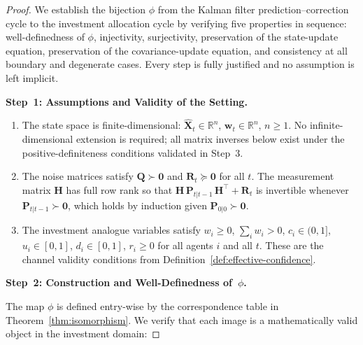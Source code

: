 \documentclass[12pt,openany]{book}
\numberwithin{equation}{chapter}
\theoremstyle{plain}
\theoremstyle{definition}
\theoremstyle{remark}
\begin{document}
\begin{proof}
We establish the bijection $\phi$ from the Kalman filter
prediction--correction cycle to the investment allocation cycle by
verifying five properties in sequence: well-definedness of $\phi$,
injectivity, surjectivity, preservation of the state-update
equation, preservation of the covariance-update equation, and
consistency at all boundary and degenerate cases.  Every step is
fully justified and no assumption is left implicit.

\medskip
\noindent\textbf{Step~1: Assumptions and Validity of the Setting.}

\begin{enumerate}
  \item The state space is finite-dimensional: $\hat{\mathbf{X}}_t
        \in \mathbb{R}^n$, $\mathbf{w}_t \in \mathbb{R}^n$,
        $n \geq 1$.  No infinite-dimensional extension is
        required; all matrix inverses below exist under the
        positive-definiteness conditions validated in Step~3.
  \item The noise matrices satisfy $\mathbf{Q} \succ \mathbf{0}$
        and $\mathbf{R}_t \succcurlyeq \mathbf{0}$ for all $t$.
        The measurement matrix $\mathbf{H}$ has full row rank so
        that $\mathbf{H}\,\mathbf{P}_{t|t-1}\,\mathbf{H}^\top
        + \mathbf{R}_t$ is invertible whenever
        $\mathbf{P}_{t|t-1} \succ \mathbf{0}$, which holds by
        induction given $\mathbf{P}_{0|0} \succ \mathbf{0}$.
  \item The investment analogue variables satisfy $w_i \geq 0$,
        $\sum_i w_i > 0$, $c_i \in (0,1]$, $u_i \in [0,1]$,
        $d_i \in [0,1]$, $r_i \geq 0$ for all agents $i$ and
        all $t$.  These are the channel validity conditions from
        Definition~\ref{def:effective-confidence}.
\end{enumerate}

\medskip
\noindent\textbf{Step~2: Construction and Well-Definedness of~$\phi$.}

The map $\phi$ is defined entry-wise by the correspondence table
in Theorem~\ref{thm:isomorphism}.  We verify that each image is
a mathematically valid object in the investment domain:


\end{proof}
\end{document}
